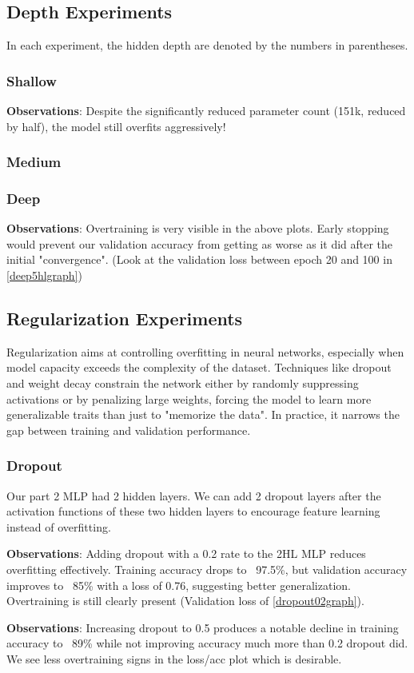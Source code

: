 \documentclass[12pt]{article}
\begin{document}
	
		\subsection{Depth Experiments}
		In each experiment, the hidden depth are denoted by the numbers in parentheses.
			\subsubsection{Shallow}
			
			\textbf{Observations}: Despite the significantly reduced parameter count (151k, reduced by half), the model still overfits aggressively!
			
			
			\subsubsection{Medium}
			
			\subsubsection{Deep}
			
	\textbf{Observations}:  Overtraining is very visible in the above plots. Early stopping would prevent our validation accuracy from getting as worse as it did after the initial "convergence". (Look at the validation loss between epoch 20 and 100 in \ref{deep5hlgraph})
		\subsection{Regularization Experiments}
		Regularization aims at controlling overfitting in neural networks, especially when model capacity exceeds the complexity of the dataset. Techniques like dropout and weight decay constrain the network either by randomly suppressing activations or by penalizing large weights, forcing the model to learn more generalizable traits than just to "memorize the data". In practice, it narrows the gap between training and validation performance.
		\subsubsection{Dropout }
		Our part 2 MLP had 2 hidden layers. We can add 2 dropout layers after the activation functions of these two hidden layers to encourage feature learning instead of overfitting.
		
			\textbf{Observations}: Adding dropout with a 0.2 rate to the 2HL MLP reduces overfitting effectively. Training accuracy drops to ~97.5\%, but validation accuracy improves to ~85\% with a loss of 0.76, suggesting better generalization. Overtraining is still clearly present (Validation loss of \ref{dropout02graph}).
		
		\textbf{Observations}: Increasing dropout to 0.5 produces a notable decline in training accuracy to ~89\% while not improving accuracy much more than 0.2 dropout did. We see less overtraining signs in the loss/acc plot which is desirable.
\end{document}
